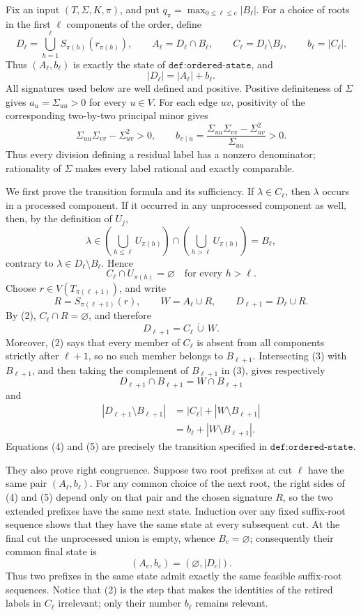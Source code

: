 Fix an input \((T,\Sigma,K,\pi)\), and put \(q_\pi=\max_{0\leq \ell\leq c}|B_\ell|\).  For a choice of roots in the first \(\ell\) components of the order, define
\[
D_\ell=\bigcup_{h=1}^{\ell}S_{\pi(h)}(r_{\pi(h)}),
\qquad
A_\ell=D_\ell\cap B_\ell,
\qquad
C_\ell=D_\ell\setminus B_\ell,
\qquad
b_\ell=|C_\ell|.
\]
Thus \((A_\ell,b_\ell)\) is exactly the state of \(\texttt{def:ordered-state}\), and
\[
|D_\ell|=|A_\ell|+b_\ell. \tag{1}
\]
All signatures used below are well defined and positive.  Positive definiteness of \(\Sigma\) gives \(a_u=\Sigma_{uu}>0\) for every \(u\in V\).  For each edge \(uv\), positivity of the corresponding two-by-two principal minor gives
\[
\Sigma_{uu}\Sigma_{vv}-\Sigma_{uv}^{2}>0,
\qquad
b_{v\mid u}=\frac{\Sigma_{uu}\Sigma_{vv}-\Sigma_{uv}^{2}}{\Sigma_{uu}}>0.
\]
Thus every division defining a residual label has a nonzero denominator; rationality of \(\Sigma\) makes every label rational and exactly comparable.

We first prove the transition formula and its sufficiency.  If \(\lambda\in C_\ell\), then \(\lambda\) occurs in a processed component.  If it occurred in any unprocessed component as well, then, by the definition of \(U_j\),
\[
\lambda\in
\left(\bigcup_{h\leq\ell}U_{\pi(h)}\right)
\cap
\left(\bigcup_{h>\ell}U_{\pi(h)}\right)
=B_\ell,
\]
contrary to \(\lambda\in D_\ell\setminus B_\ell\).  Hence
\[
C_\ell\cap U_{\pi(h)}=\varnothing
\quad\text{for every }h>\ell. \tag{2}
\]
Choose \(r\in V(T_{\pi(\ell+1)})\), and write
\[
R=S_{\pi(\ell+1)}(r),
\qquad
W=A_\ell\cup R,
\qquad
D_{\ell+1}=D_\ell\cup R.
\]
By (2), \(C_\ell\cap R=\varnothing\), and therefore
\[
D_{\ell+1}=C_\ell\,\dot\cup\,W. \tag{3}
\]
Moreover, (2) says that every member of \(C_\ell\) is absent from all components strictly after \(\ell+1\), so no such member belongs to \(B_{\ell+1}\).  Intersecting (3) with \(B_{\ell+1}\), and then taking the complement of \(B_{\ell+1}\) in (3), gives respectively
\[
D_{\ell+1}\cap B_{\ell+1}=W\cap B_{\ell+1} \tag{4}
\]
and
\[
\begin{aligned}
|D_{\ell+1}\setminus B_{\ell+1}|
&=|C_\ell|+|W\setminus B_{\ell+1}|\\
&=b_\ell+|W\setminus B_{\ell+1}|. \tag{5}
\end{aligned}
\]
Equations (4) and (5) are precisely the transition specified in \(\texttt{def:ordered-state}\).

They also prove right congruence.  Suppose two root prefixes at cut \(\ell\) have the same pair \((A_\ell,b_\ell)\).  For any common choice of the next root, the right sides of (4) and (5) depend only on that pair and the chosen signature \(R\), so the two extended prefixes have the same next state.  Induction over any fixed suffix-root sequence shows that they have the same state at every subsequent cut.  At the final cut the unprocessed union is empty, whence \(B_c=\varnothing\); consequently their common final state is
\[
(A_c,b_c)=(\varnothing,|D_c|). \tag{6}
\]
Thus two prefixes in the same state admit exactly the same feasible suffix-root sequences.  Notice that (2) is the step that makes the identities of the retired labels in \(C_\ell\) irrelevant; only their number \(b_\ell\) remains relevant.

